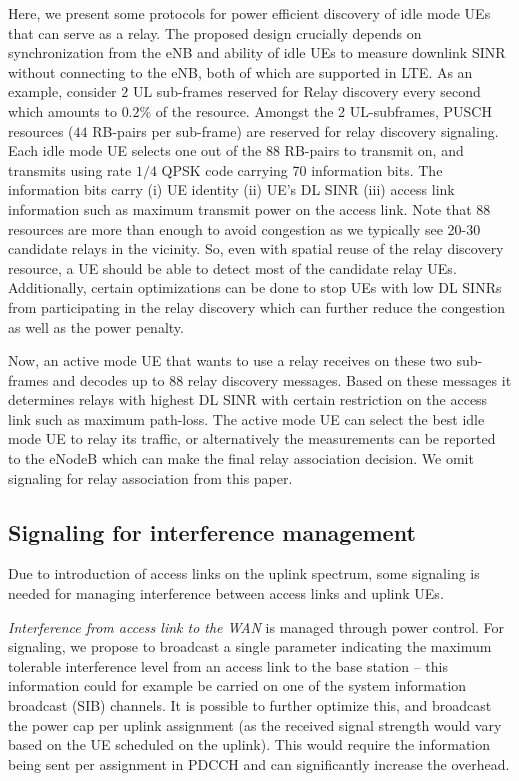 \documentclass[journal]{IEEEtran}
\begin{document}
Here, we present some protocols for power efficient discovery of idle mode UEs that can serve as a relay. The proposed design crucially depends on synchronization from the eNB and ability of idle UEs to measure downlink SINR without connecting to the eNB, both of which are supported in LTE.
As an example, consider $2$ UL sub-frames reserved for Relay discovery every second which amounts to $0.2\%$ of the resource. Amongst the 2 UL-subframes, PUSCH resources ($44$ RB-pairs per sub-frame) are reserved for relay discovery signaling. Each idle mode UE selects one out of the $88$ RB-pairs to transmit on, and transmits using rate $1/4$ QPSK code carrying 70 information bits. The information bits carry (i) UE identity (ii) UE's DL SINR (iii) access link information such as maximum transmit power on the access link. Note that $88$ resources are more than enough to avoid congestion as we typically see 20-30 candidate relays in the vicinity. So, even with spatial reuse of the relay discovery resource, a UE should be able to detect most of the candidate relay UEs. Additionally, certain optimizations can be done to stop UEs with low DL SINRs from participating in the relay discovery which can further reduce the congestion as well as the power penalty.

Now, an active mode UE that wants to use a relay receives on these two sub-frames and decodes up to $88$ relay discovery messages. Based on these messages it determines relays with highest DL SINR with certain restriction on the access link such as maximum path-loss. The active mode UE can select the best idle mode UE to relay its traffic, or alternatively the measurements can be reported to the eNodeB which can make the final relay association decision. We omit signaling for relay association from this paper.

\subsection{Signaling for interference management}

Due to introduction of access links on the uplink spectrum, some signaling is needed for managing interference between access links and uplink UEs.

{\em Interference from access link to the WAN} is managed through power control. For signaling, we propose to broadcast a single parameter indicating the maximum tolerable interference level from an access link to the base station -- this information could for example be carried on one of the system information broadcast (SIB) channels. It is possible to further optimize this, and broadcast the power cap per uplink assignment (as the received signal strength would vary based on the UE scheduled on the uplink). This would require the information being sent per assignment in PDCCH and can significantly increase the overhead.
\end{document}
